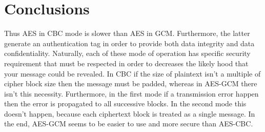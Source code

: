 \documentclass[11pt]{article}
\begin{document}
\section{Conclusions}
Thus AES in CBC mode is slower than AES in GCM. Furthermore, the latter generate an authentication tag in order to provide both data integrity and data confidentiality. Naturally, each of these mode of operation has specific security requirement that must be respected in order to decreases the likely hood that your message could be revealed. In CBC if the size of plaintext isn't a multiple of cipher block size then the message must be padded, whereas in AES-GCM there isn't this necessity. Furthermore, in the first mode if a transmission error happen then the error is propagated to all successive blocks. In the second mode this doesn't happen, because each ciphertext block is treated as a single message. In the end, AES-GCM seems to be easier to use and more secure than AES-CBC.
\end{document}
